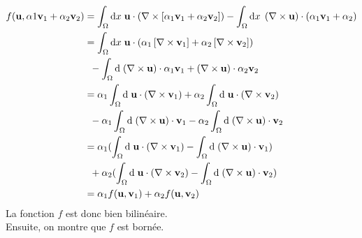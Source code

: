 \documentclass[letterpaper,12pt,oneside,final]{book}
\begin{document}
\begin{equation*}
\begin{split}
	f(\vb{u},\alpha{1}\vb{v}_{1}+\alpha_{2}\vb{v}_{2}) &= \int_{\Omega }\text{d}x\; \vb{u}\cdot \left(\nabla \times \left[ \alpha_{1}\vb{v}_{1}+\alpha_{2}\vb{v}_{2} \right] \right) - 
\int_{\Omega }\text{d}x\;\left( \nabla \times \vb{u}  \right) \cdot (\alpha_{1}\vb{v}_{1}+\alpha_{2}) \\ 
& = \int_{\Omega}\text{d}x\; \vb{u}\cdot (\alpha_{1} \left[ \nabla \times \vb{v}_{1} \right] + \alpha_{2}\left[ \nabla \times \vb{v}_{2}  \right])\\ 
&\;\; - \int_{\Omega}\text{d}\; (\nabla \times \vb{u} ) \cdot \alpha_{1}\vb{v}_{1} + (\nabla \times \vb{u} ) \cdot \alpha_{2}\vb{v}_{2} \\ 
& = \alpha_{1}\int_{\Omega}\text{d}\; \vb{u}\cdot (\nabla \times \vb{v}_{1} ) + \alpha_{2}\int_{\Omega}\text{d}\; \vb{u}\cdot (\nabla \times \vb{v}_{2} ) \\ 
&\;\; -\alpha_{1}\int_{\Omega}\text{d}\; (\nabla \times \vb{u} )\cdot \vb{v}_{1} -\alpha_{2}\int_{\Omega}\text{d}\; (\nabla \times \vb{u} )\cdot  \vb{v}_{2} \\ 
& = \alpha_{1}(\int_{\Omega}\text{d}\; \vb{u}\cdot (\nabla \times \vb{v}_{1} ) - \int_{\Omega}\text{d}\; (\nabla \times \vb{u} )\cdot \vb{v}_{1} ) \\ 
& \;\; + \alpha_{2}(\int_{\Omega}\text{d}\; \vb{u}\cdot (\nabla \times \vb{v}_{2} ) - \int_{\Omega}\text{d}\; (\nabla \times \vb{u} )\cdot \vb{v}_{2} ) \\ 
& = \alpha_{1}f(\vb{u},\vb{v}_{1}) + \alpha_{2}f(\vb{u},\vb{v}_{2})
\end{split}
\end{equation*}
La fonction \( f \) est donc bien bilinéaire. \\ 
Ensuite, on montre que \( f \) est bornée. \\ 
\end{document}

